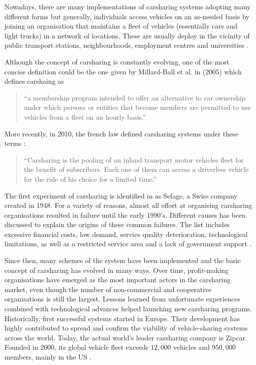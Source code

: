 \begin{bibunit}[ieeetr]
\medskip
Nowadays, there are many implementations of carsharing systems adopting many different forms but generally, individuals access vehicles on an as-needed basis by joining an organisation that maintains a fleet of vehicles (essentially cars and light trucks) in a network of locations.
These are usually deploy in the vicinity of public transport stations, neighbourhoods, employment centres and universities \cite{shaheen_carsharing_1998}.

\bigskip
Although the concept of carsharing is constantly evolving, one of the most concise definition could be the one given by Millard-Ball et al. in (2005) \cite{millard_ball_car_sharing_2005} which defines carshaing as
\begin{quote} %
``a membership program intended to offer an alternative to car ownership under which persons or entities that become members are permitted to use vehicles from a fleet on an hourly basis.''
\end{quote}
More recently, in 2010, the french law defined carsharing systems under these terms \cite{cs_loi_2010}:
\begin{quote}
``Carsharing is the pooling of an inland transport motor vehicles fleet for the benefit of subscribers. Each one of them can access a driverless vehicle for the ride of his choice for a limited time.''
\end{quote}

\bigskip
The first experiment of carsharing is identified in \cite{shaheen_short_1999} as Sefage, a Swiss company created in 1948.
For a variety of reasons, almost all effort at organising carsharing organisations resulted in failure until the early 1990's.
Different causes has been discussed to explain the origins of these common failures.
The list includes excessive financial costs, low demand, service quality deterioration, technological limitations, as well as a restricted service area and a lack of government support \cite{harms_emergence_1998, cousins_theory_2000}.

\medskip
Since then, many schemes of the system have been implemented and the basic concept of carsharing has evolved in many ways.
Over time, profit-making organisations have emerged as the most important actors in the carsharing market, even though the number of non-commercial and cooperative organisations is still the largest.
Lessons learned from unfortunate experiences combined with technological advances helped launching new carsharing programs.
Historically, first successful systems started in Europe.
Their development has highly contributed to spread and confirm the viability of vehicle-sharing systems across the world.
Today, the actual world's leader carsharing company is Zipcar.
Founded in 2000, its global vehicle fleet exceeds $12,000$ vehicles and $950,000$ members, mainly in the US \cite{zipcar_website}.


\end{bibunit}
